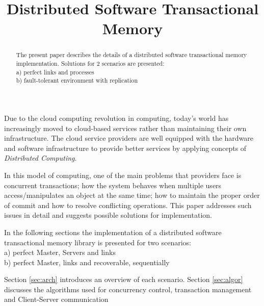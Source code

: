 \documentclass[times, 10pt,twocolumn]{article}
\begin{document}
\title{Distributed Software Transactional Memory}

\maketitle
\thispagestyle{empty}

\begin{abstract}
   The present paper describes the details of a distributed software
   transactional memory implementation.
   Solutions for 2 scenarios are presented: \\
   a) perfect links and processes \\
   b) fault-tolerant environment with replication \\
\end{abstract}

Due to the cloud computing revolution in computing, today’s world has increasingly moved to cloud-based services rather than maintaining their own infrastructure. The cloud service providers are well equipped with the hardware and software infrastructure to provide better services by applying concepts of {\it Distributed Computing}. 

In this model of computing, one of the main problems that providers face is concurrent transactions; how the system behaves when multiple users access/manipulates an object at the same time; how to maintain the proper order of commit and how to resolve conflicting operations. This paper addresses such issues in detail and suggests possible solutions for implementation.

In the following sections the implementation of a distributed software transactional memory library is presented for two scenarios: \\
a) perfect Master, Servers and links \\
b) perfect Master, links and recoverable, sequentially 

Section \ref{sec:arch} introduces an overview of each scenario. Section 
\ref{sec:algor} discusses the algorithms used for concurrency control, 
transaction management and Client-Server communication


\label{sec:arch}
\end{document}
